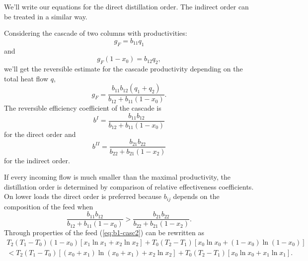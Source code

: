 \documentclass[12pt]{article}
\begin{document}
We'll write our equations for the direct distillation order. The indirect order can be treated in a similar way. 

Considering the cascade of two columns with productivities:
\begin{equation}
g_F = b_{11} q_1
\end{equation}
and
\begin{equation}
g_F(1-x_0) = b_{12} q_2,
\end{equation}
we'll get the reversible estimate for the cascade productivity depending on the total heat flow $q$,
\begin{equation}
g_F = \frac{b_{11}b_{12}(q_1+q_2)}{b_{12}+b_{11}(1-x_0)}.
\label{eq:casc-r}
\end{equation}
The reversible efficiency coefficient of the cascade is
\begin{equation}
b^I = \frac{b_{11}b_{12}}{b_{12}+b_{11}(1-x_0)}
\label{eq:b-casc}
\end{equation}
for the direct order and
\begin{equation}
b^{II} = \frac{b_{21}b_{22}}{b_{22}+b_{21}(1-x_2)}
\label{eq:b-casc2}
\end{equation}
for the indirect order.

If every incoming flow is much smaller than the maximal productivity, the distillation order is determined by comparison of relative effectiveness coefficients. On lower loads the direct order is preferred because $b_{ij}$ depends on the composition of the feed when
\begin{equation}
\frac{b_{11}b_{12}}{b_{12}+b_{11}(1-x_0)}>\frac{b_{21}b_{22}}{b_{22}+b_{21}(1-x_2)}.
\label{eq:b1-casc2}
\end{equation}
Through properties of the feed (\ref{eq:b1-casc2}) can be rewritten as
\begin{equation}
\begin{array}{c}
T_2(T_1 - T_0)(1-x_0)\left[x_1\ln x_1 + x_2\ln x_2\right] + T_0(T_2 - T_1)\left[x_0\ln x_0 + (1-x_0)\ln(1-x_0)\right] \\
< T_2(T_1 - T_0)\left[(x_0+x_1)\ln(x_0+x_1)+x_2\ln x_2\right]+T_0(T_2 - T_1)\left[x_0\ln x_0 + x_1\ln x_1\right].
\end{array}
\label{eq:b1-sc2}
\end{equation}
\end{document}
